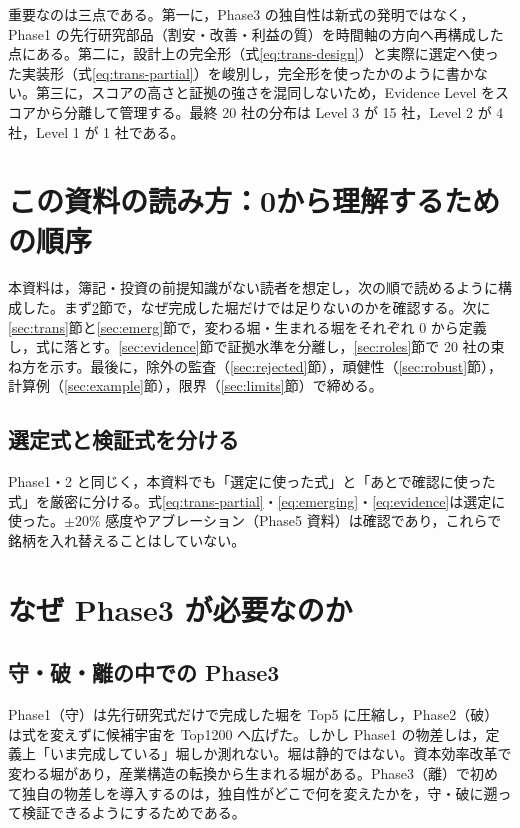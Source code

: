 \documentclass[a4paper,10pt]{article}
\begin{document}
重要なのは三点である。第一に，Phase3 の独自性は新式の発明ではなく，Phase1 の先行研究部品（割安・改善・利益の質）を時間軸の方向へ再構成した点にある。第二に，設計上の完全形（式\eqref{eq:trans-design}）と実際に選定へ使った実装形（式\eqref{eq:trans-partial}）を峻別し，完全形を使ったかのように書かない。第三に，スコアの高さと証拠の強さを混同しないため，Evidence Level をスコアから分離して管理する。最終 20 社の分布は Level 3 が 15 社，Level 2 が 4 社，Level 1 が 1 社である。

\section{この資料の読み方：0から理解するための順序}

本資料は，簿記・投資の前提知識がない読者を想定し，次の順で読めるように構成した。まず\ref{sec:why}節で，なぜ完成した堀だけでは足りないのかを確認する。次に\ref{sec:trans}節と\ref{sec:emerg}節で，変わる堀・生まれる堀をそれぞれ 0 から定義し，式に落とす。\ref{sec:evidence}節で証拠水準を分離し，\ref{sec:roles}節で 20 社の束ね方を示す。最後に，除外の監査（\ref{sec:rejected}節），頑健性（\ref{sec:robust}節），計算例（\ref{sec:example}節），限界（\ref{sec:limits}節）で締める。

\subsection{選定式と検証式を分ける}

Phase1・2 と同じく，本資料でも「選定に使った式」と「あとで確認に使った式」を厳密に分ける。式\eqref{eq:trans-partial}・\eqref{eq:emerging}・\eqref{eq:evidence}は選定に使った。$\pm20\%$ 感度やアブレーション（Phase5 資料）は確認であり，これらで銘柄を入れ替えることはしていない。

\section{なぜ Phase3 が必要なのか}
\label{sec:why}

\subsection{守・破・離の中での Phase3}

Phase1（守）は先行研究式だけで完成した堀を Top5 に圧縮し，Phase2（破）は式を変えずに候補宇宙を Top1200 へ広げた。しかし Phase1 の物差しは，定義上「いま完成している」堀しか測れない。堀は静的ではない。資本効率改革で変わる堀があり，産業構造の転換から生まれる堀がある。Phase3（離）で初めて独自の物差しを導入するのは，独自性がどこで何を変えたかを，守・破に遡って検証できるようにするためである。
\end{document}
